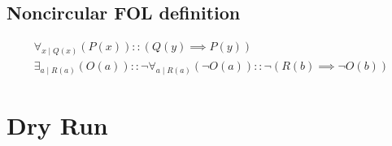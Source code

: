 \documentclass[a4paper]{article}
\makeatletter
\newcommand{\tdb}[1]{\colorbox{lime}{$\displaystyle #1$}}
\newcommand{\cusand}{,}
\newcommand{\cuspop}{.}
\newcommand{\eqComment}[1]{\text{  \# #1}}
\newcommand{\n}{\\[1.5ex] \hline \nonumber \\[0ex]}
\newcommand{\m}{\nonumber \\}
\newcommand\rfrlist[1]{%
    \forcsvlist{\rfrlist@item}{#1}
}
\newcommand\rfrlist@item[1]{\rfr{#1}\\}
\newcommand{\thmlink}[2]{{}_{\substack{\rfrlist{#1}}}^{\dfn{#2}} }
\makeatother
\begin{document}
\begin{comment}
\m \eqComment{Boolean De Morgan's Laws}
\n \thmlink{\implies}{THM-CtrP-1} (x \rfr{IF} y = (\rfr{NOT} x) \rfr{OR} y) \cusand 
\m \thmlink{POS-LCom, THM-LInv}{THM-CtrP-2} ((\rfr{NOT} x) \rfr{OR} y = ((\rfr{NOT} \rfr{NOT} y) \rfr{OR} (\rfr{NOT} x))) \cusand 
\m \thmlink{\implies}{THM-CtrP-3} ((\rfr{NOT} \rfr{NOT} y) \rfr{OR} (\rfr{NOT} x) = (\rfr{NOT} y) \rfr{IF} (\rfr{NOT} x)) \cusand 
\m \thmlink{THM-CtrP-1, THM-CtrP-2, THM-CtrP-3}{THM-CtrP} (x \rfr{IF} y = (\rfr{NOT} y) \rfr{IF} (\rfr{NOT} x)) \cuspop
\m \eqComment{Contrapositive Law} 
\n \tdb{(\rfr{T} \rfr{IF} x = x)}
\n \tdb{(\rfr{F} \rfr{IF} x = \rfr{T})}
\n \tdb{(x \rfr{IF} \rfr{T} = \rfr{T})}
\n \tdb{(x \rfr{IF} \rfr{F} = \rfr{NOT} x)}  
\n \tdb{((x \rfr{OR} y) \rfr{IF} z) = (x \rfr{IF} z) \rfr{AND} (y \rfr{IF} z)}
\n \tdb{(x \rfr{IF} (y \rfr{AND} z) = (x \rfr{IF} y) \rfr{AND} (x \rfr{IF} z))} 
\end{align}
\end{tcolorbox}

\end{comment}


\subsection{Noncircular FOL definition}
\begin{tcolorbox}
\begin{align}
   \forall_{x \mid Q(x)} (P(x)) :: (Q(y) \implies P(y))
\m \exists_{a \mid R(a)} (O(a)) :: \lnot \forall_{a \mid R(a)} (\lnot O(a)) :: \lnot (R(b) \implies \lnot O(b)) 
\end{align}
\end{tcolorbox}


%

\section{Dry Run}
\end{document}
